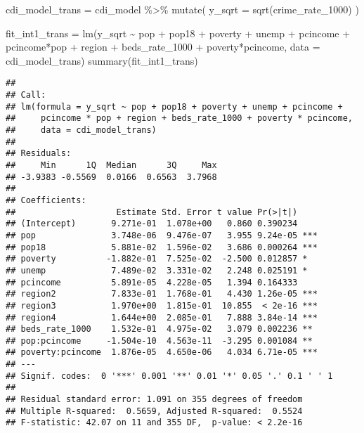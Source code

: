 \documentclass[
  11pt,
]{article}
\newenvironment{Shaded}{\begin{snugshade}}{\end{snugshade}}
\newcommand{\AttributeTok}[1]{\textcolor[rgb]{0.77,0.63,0.00}{#1}}
\newcommand{\FunctionTok}[1]{\textcolor[rgb]{0.00,0.00,0.00}{#1}}
\newcommand{\NormalTok}[1]{#1}
\newcommand{\OtherTok}[1]{\textcolor[rgb]{0.56,0.35,0.01}{#1}}
\newcommand{\SpecialCharTok}[1]{\textcolor[rgb]{0.00,0.00,0.00}{#1}}
\begin{document}
\begin{Shaded}
\begin{Highlighting}[]
\NormalTok{cdi\_model\_trans }\OtherTok{=}\NormalTok{ cdi\_model }\SpecialCharTok{\%\textgreater{}\%} 
  \FunctionTok{mutate}\NormalTok{(}
    \AttributeTok{y\_sqrt =} \FunctionTok{sqrt}\NormalTok{(crime\_rate\_1000)}
\NormalTok{  )}

\NormalTok{fit\_int1\_trans }\OtherTok{=} \FunctionTok{lm}\NormalTok{(y\_sqrt }\SpecialCharTok{\textasciitilde{}}  
\NormalTok{                   pop }\SpecialCharTok{+}\NormalTok{ pop18 }\SpecialCharTok{+} 
\NormalTok{                  poverty }\SpecialCharTok{+}\NormalTok{ unemp }\SpecialCharTok{+}\NormalTok{ pcincome }\SpecialCharTok{+}\NormalTok{ pcincome}\SpecialCharTok{*}\NormalTok{pop }\SpecialCharTok{+}\NormalTok{ region }\SpecialCharTok{+}
\NormalTok{                  beds\_rate\_1000  }\SpecialCharTok{+}
\NormalTok{                  poverty}\SpecialCharTok{*}\NormalTok{pcincome, }\AttributeTok{data =}\NormalTok{ cdi\_model\_trans)}
\FunctionTok{summary}\NormalTok{(fit\_int1\_trans)}
\end{Highlighting}
\end{Shaded}

\begin{verbatim}
## 
## Call:
## lm(formula = y_sqrt ~ pop + pop18 + poverty + unemp + pcincome + 
##     pcincome * pop + region + beds_rate_1000 + poverty * pcincome, 
##     data = cdi_model_trans)
## 
## Residuals:
##     Min      1Q  Median      3Q     Max 
## -3.9383 -0.5569  0.0166  0.6563  3.7968 
## 
## Coefficients:
##                    Estimate Std. Error t value Pr(>|t|)    
## (Intercept)       9.271e-01  1.078e+00   0.860 0.390234    
## pop               3.748e-06  9.476e-07   3.955 9.24e-05 ***
## pop18             5.881e-02  1.596e-02   3.686 0.000264 ***
## poverty          -1.882e-01  7.525e-02  -2.500 0.012857 *  
## unemp             7.489e-02  3.331e-02   2.248 0.025191 *  
## pcincome          5.891e-05  4.228e-05   1.394 0.164333    
## region2           7.833e-01  1.768e-01   4.430 1.26e-05 ***
## region3           1.970e+00  1.815e-01  10.855  < 2e-16 ***
## region4           1.644e+00  2.085e-01   7.888 3.84e-14 ***
## beds_rate_1000    1.532e-01  4.975e-02   3.079 0.002236 ** 
## pop:pcincome     -1.504e-10  4.563e-11  -3.295 0.001084 ** 
## poverty:pcincome  1.876e-05  4.650e-06   4.034 6.71e-05 ***
## ---
## Signif. codes:  0 '***' 0.001 '**' 0.01 '*' 0.05 '.' 0.1 ' ' 1
## 
## Residual standard error: 1.091 on 355 degrees of freedom
## Multiple R-squared:  0.5659, Adjusted R-squared:  0.5524 
## F-statistic: 42.07 on 11 and 355 DF,  p-value: < 2.2e-16
\end{verbatim}
\end{document}
